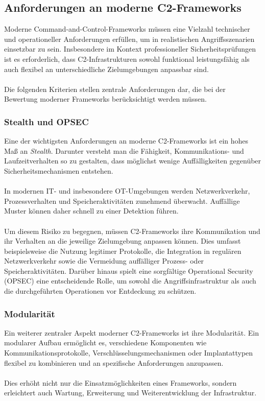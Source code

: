 \subsection{Anforderungen an moderne C2-Frameworks}
Moderne Command-and-Control-Frameworks müssen eine Vielzahl technischer und operationeller Anforderungen erfüllen, um in realistischen Angriffsszenarien einsetzbar zu sein. 
Insbesondere im Kontext professioneller Sicherheitsprüfungen ist es erforderlich, dass C2-Infrastrukturen sowohl funktional leistungsfähig als auch flexibel an unterschiedliche Zielumgebungen anpassbar sind.
\\\\
Die folgenden Kriterien stellen zentrale Anforderungen dar, die bei der Bewertung moderner Frameworks berücksichtigt werden müssen.
\subsubsection{Stealth und OPSEC}
Eine der wichtigsten Anforderungen an moderne C2-Frameworks ist ein hohes Maß an \textit{Stealth}. 
Darunter versteht man die Fähigkeit, Kommunikations- und Laufzeitverhalten so zu gestalten, dass möglichst wenige Auffälligkeiten gegenüber Sicherheitsmechanismen entstehen.
\\\\
In modernen IT- und insbesondere OT-Umgebungen werden Netzwerkverkehr, Prozessverhalten und Speicheraktivitäten zunehmend überwacht. 
Auffällige Muster können daher schnell zu einer Detektion führen.
\\\\
Um diesem Risiko zu begegnen, müssen C2-Frameworks ihre Kommunikation und ihr Verhalten an die jeweilige Zielumgebung anpassen können. 
Dies umfasst beispielsweise die Nutzung legitimer Protokolle, die Integration in regulären Netzwerkverkehr sowie die Vermeidung auffälliger Prozess- oder Speicheraktivitäten. 
Darüber hinaus spielt eine sorgfältige Operational Security (OPSEC) eine entscheidende Rolle, um sowohl die Angriffsinfrastruktur als auch die durchgeführten Operationen vor Entdeckung zu schützen.
\subsubsection{Modularität}
Ein weiterer zentraler Aspekt moderner C2-Frameworks ist ihre Modularität. 
Ein modularer Aufbau ermöglicht es, verschiedene Komponenten wie Kommunikationsprotokolle, Verschlüsselungsmechanismen oder Implantattypen flexibel zu kombinieren und an spezifische Anforderungen anzupassen.
\\\\
Dies erhöht nicht nur die Einsatzmöglichkeiten eines Frameworks, sondern erleichtert auch Wartung, Erweiterung und Weiterentwicklung der Infrastruktur.
